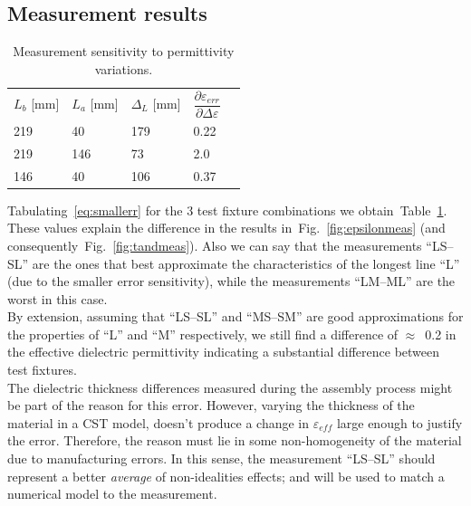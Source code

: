 \documentclass[11pt,a4paper]{article}
\newcommand{\fig}[1]{Fig.~\ref{#1}}
\newcommand{\tabl}[1]{Table~\ref{#1}}
\newcommand{\laser}[1]{``#1''}
\begin{document}
    \subsection{Measurement results}
    \label{subsec:measure-error}
    \begin{table}[!b]
        \centering
        \begin{tabular}{|l|l|l|l|l}
            \cline{1-4}
            $L_b$ {[}mm{]} & $L_a$ {[}mm{]} & $\Delta_L$ {[}mm{]} & $\dfrac{\partial \varepsilon_{err}}{\partial \Delta\varepsilon}$  \rule[-4mm]{0mm}{11mm}&  \\ \cline{1-4}
            219            & 40             & 179                 & 0.22                                                                                   & \\ \cline{1-4}
            219            & 146            & 73                  & 2.0                                                                                    & \\ \cline{1-4}
            146            & 40             & 106                 & 0.37                                                                                   & \\ \cline{1-4}
        \end{tabular}
        \caption{Measurement sensitivity to permittivity variations.}
        \label{tab:errorsensitivity}
    \end{table}

    Tabulating~\eqref{eq:smallerr} for the 3 test fixture combinations we obtain~\tabl{tab:errorsensitivity}.
    These values explain the difference in the results in~\fig{fig:epsilonmeas} (and consequently~\fig{fig:tandmeas}).
    Also we can say that the measurements \laser{LS--SL} are the ones that best approximate the characteristics of the
    longest line \laser{L} (due to the smaller error sensitivity), while the measurements \laser{LM--ML} are the worst
    in this case.\\
    By extension, assuming that \laser{LS--SL} and \laser{MS--SM} are good approximations for the properties of
    \laser{L} and \laser{M} respectively, we still find a difference of $\approx$~0.2 in the effective dielectric
    permittivity indicating a substantial difference between test fixtures.\\
    The dielectric thickness differences measured during the assembly process might be part of the reason for this error.
    However, varying the thickness of the material in a CST model, doesn't produce a change in $\varepsilon_{eff}$
    large enough to justify the error.
    Therefore, the reason must lie in some non-homogeneity of the material due to manufacturing errors.
    In this sense, the measurement \laser{LS--SL} should represent a better \emph{average} of non-idealities effects;
    and will be used to match a numerical model to the measurement.
\end{document}
